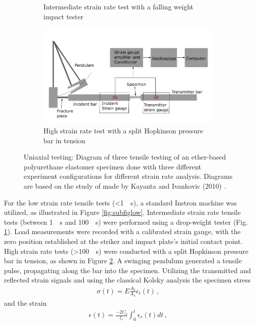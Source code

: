 \begin{figure}
\begin{subfigure}[b]{0.45\textwidth}
        \caption{Intermediate strain rate test with a falling weight impact tester}
        \label{fig:subfiginter}
        \end{subfigure}
        \vspace{0.5cm}
        \begin{subfigure}[b]{0.7\textwidth}
        \centering
        \includegraphics[width=\textwidth]{Images/chapter1/uniaxialhigh.png}
        \caption{High strain rate test with a split Hopkinson pressure bar in tension}
        \label{fig:subfighigh}
        \end{subfigure}  
        \hspace{0.3cm}

        \caption{Uniaxial testing: Diagram of three tensile testing of an ether-based polyurethane elastomer specimen done with three different experiment configurations for different strain rate analysis. Diagrams are based on the study of made by Kayanta and Ivankovic (2010) \cite{Kanyanta2010}.}
        \label{fig:uniaxialkan}
\end{figure}

For the low strain rate tensile tests (\SI[per-mode = symbol]{<1}{\per \second}), a standard Instron machine was utilized, as illustrated in Figure 
\ref{fig:subfiglow}. Intermediate strain rate tensile tests (between \SI[per-mode = symbol]{1}{\per \second} and \SI[per-mode = symbol]{100}{\per \second}) 
were performed using a drop-weight tester (Fig. \ref{fig:subfiginter}). Load measurements were recorded with a calibrated strain gauge, 
with the zero position established at the striker and impact plate's initial contact point.
High strain rate tests (\SI[per-mode = symbol]{>100}{\per \second}) were conducted with a split Hopkinson pressure bar in tension, as shown in Figure \ref{fig:subfighigh}.
A swinging pendulum generated a tensile pulse, propagating along the bar into the specimen. Utilizing 
the transmitted and reflected strain signals and using the classical Kolsky analysis the specimen stress
\begin{align*}
        \sigma(t) = E\frac{A_b}{A_s}\epsilon_t(t) \, ,
\end{align*}
and the strain
\begin{align*}
        \epsilon(t) = \frac{-2C_b}{l_s} \int_{0}^{t} \epsilon_r(t) dt \, ,
\end{align*}

